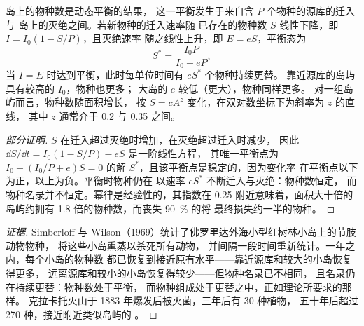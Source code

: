 \begin{theorem}[岛屿生物地理学的平衡理论]\label{thm:b1:ecosystem-dynamics:island}
岛上的物种数是动态平衡的结果，
这一平衡发生于来自含 $P$ 个物种的源库的迁入与
岛上的灭绝之间。若新物种的迁入速率随
已存在的物种数 $S$ 线性下降，即 $I = I_0(1 - S/P)$，且灭绝速率
随之线性上升，即 $E = eS$，平衡态为
\[
S^* = \frac{I_0 P}{I_0 + eP} ,
\]
当 $I = E$ 时达到平衡，此时每单位时间有 $eS^*$ 个物种持续更替。
靠近源库的岛屿具有较高的 $I_0$，物种也更多；
大岛的 $e$ 较低（更大），物种同样更多。
对一组岛屿而言，物种数随面积增长，
按 $S = cA^z$ 变化，在双对数坐标下为斜率为 $z$ 的直线，
其中 $z$ 通常介于 \num{0.2} 与 \num{0.35} 之间。
\end{theorem}
\begin{proof}[部分证明]
$S$ 在迁入超过灭绝时增加，在灭绝超过迁入时减少，
因此 $\dd S/\dd t = I_0(1 - S/P) - eS$ 是一阶线性方程，
其唯一平衡点为 $I_0 -
(I_0/P + e)S = 0$ 的解 $S^*$，且该平衡点是稳定的，因为变化率
在平衡点以下为正，以上为负。平衡时物种仍在
以速率 $eS^*$ 不断迁入与灭绝：物种数恒定，
而物种名录并不恒定。幂律是经验性的，其指数在
\num{0.25} 附近意味着，面积大十倍的岛屿约拥有 \num{1.8}
倍的物种数，而丧失 \qty{90}{\%} 的将
最终损失约一半的物种。
\end{proof}
\begin{proof}[证据]
Simberloff 与 Wilson（1969）统计了佛罗里达外海小型红树林小岛上的节肢动物物种，
将这些小岛熏蒸以杀死所有动物，
并间隔一段时间重新统计。一年之内，每个小岛的物种数
都已恢复到接近原有水平——靠近源库和较大的小岛恢复得更多，
远离源库和较小的小岛恢复得较少——但物种名录已不相同，
且名录仍在持续更替：物种数处于平衡，
而物种组成处于更替之中，正如理论所要求的那样。
克拉卡托火山于 1883 年爆发后被灭菌，三年后有 \num{30} 种植物，
五十年后超过 \num{270} 种，接近附近类似岛屿的
。
\end{proof}

